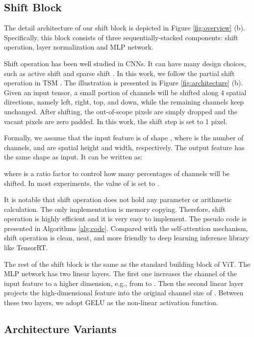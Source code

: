 \documentclass[letterpaper]{article} \usepackage{aaai22}  \usepackage{times}  \usepackage{helvet}  \usepackage{courier}  \usepackage[hyphens]{url}  \usepackage{graphicx} \usepackage{amsmath}
\begin{document}
\subsection{Shift Block}

The detail architecture of our shift block is depicted in Figure \ref{fig:overview} (b). Specifically, this block consists of three sequentially-stacked components: shift operation, layer normalization and MLP network.

Shift operation has been well studied in CNNs. It can have many design choices, such as active shift \cite{ActiveShift} and sparse shift \cite{SparseShift}. In this work, we follow the partial shift operation in TSM \cite{TSM}. The illustration is presented in Figure \ref{fig:architecture} (b). Given an input tensor, a small portion of channels will be shifted along 4 spatial directions, namely left, right, top, and down, while the remaining channels keep unchanged. After shifting, the out-of-scope pixels are simply dropped and the vacant pixels are zero padded. In this work, the shift step is set to 1 pixel.

Formally, we assume that the input feature  is of shape , where  is the number of channels,  and  are spatial height and width, respectively. The output feature  has the same shape as input. It can be written as:



\noindent where  is a ratio factor to control how many percentages of channels will be shifted. In most experiments, the value of  is set to .

It is notable that shift operation does not hold any parameter or arithmetic calculation. The only implementation is memory copying. Therefore, shift operation is highly efficient and it is very easy to implement. The pseudo code is presented in Algorithms \ref{alg:code}. Compared with the self-attention mechanism, shift operation is clean, neat, and more friendly to deep learning inference library like TensorRT.

The rest of the shift block is the same as the standard building block of ViT. The MLP network has two linear layers. The first one increases the channel of the input feature to a higher dimension, e.g., from  to . Then the second linear layer projects the high-dimensional feature into the original channel size of . Between these two layers, we adopt GELU as the non-linear activation function.

\subsection{Architecture Variants}
\end{document}
